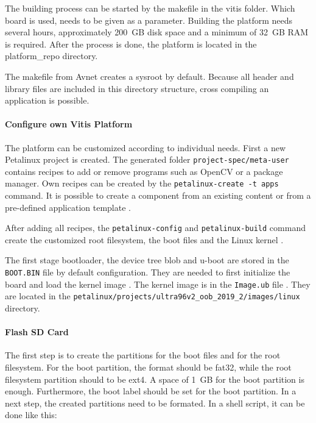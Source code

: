 The building process can be started by the makefile in the vitis folder.
Which board is used, needs to be given as a parameter.
Building the platform needs several hours, approximately \SI{200}{GB} disk space and a minimum of \SI{32}{GB} RAM is required.
After the process is done, the platform is located in the platform\_repo directory.

The makefile from Avnet creates a sysroot by default.
Because all header and library files are included in this directory structure, cross compiling an application is possible.

\paragraph{Configure own Vitis Platform}
The platform can be customized according to individual needs.
First a new Petalinux project is created.
The generated folder \texttt{project-spec/meta-user} contains recipes to add or remove programs such as OpenCV or a package manager.
Own recipes can be created by the \texttt{petalinux-create -t apps} command.
It is possible to create a component from an existing content or from a pre-defined application template \cite{petalinux_commandline_guide}.

After adding all recipes, the \texttt{petalinux-config} and \texttt{petalinux-build} command create the customized root filesystem, the boot files and the Linux kernel \cite{petalinux_user_guide}.

The first stage bootloader, the device tree blob and u-boot are stored in the \texttt{BOOT.BIN} file by default configuration.
They are needed to first initialize the board and load the kernel image \cite{xilinx_wiki_boot}.
The kernel image is in the \texttt{Image.ub} file \cite{xilinx_wiki_uboot}.
They are located in the \texttt{petalinux/projects/ultra96v2\_oob\_2019\_2/images/linux} directory.

\paragraph{Flash SD Card}
The first step is to create the partitions for the boot files and for the root filesystem.
For the boot partition, the format should be fat32, while the root filesystem partition should to be ext4.
A space of \SI{1}{GB} for the boot partition is enough.
Furthermore, the boot label should be set for the boot partition.
In a next step, the created partitions need to be formated.
In a shell script, it can be done like this:

